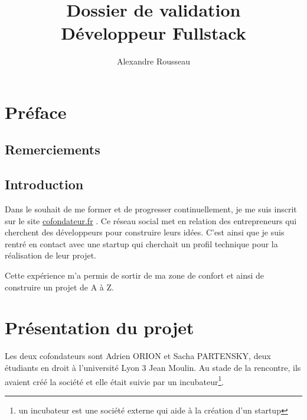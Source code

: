 \documentclass[]{report}
\title{\textbf{Dossier de validation}\\Développeur Fullstack}
\author{Alexandre Rousseau}
\begin{document}
\lstset{
  autogobble,%
  breaklines=true, %
  captionpos=b, %
  frame=single, %
  showtabs=false, %
  tabsize=2, %
}

\maketitle

\newpage

\tableofcontents
\newpage


\chapter{Préface}

  \section{Remerciements}


  \section{Introduction}

    Dans le souhait de me former et de progresser continuellement, je me suis inscrit sur le site  \href{https://cofondateur.fr}{cofondateur.fr} . Ce réseau social met en relation des entrepreneurs qui cherchent des développeurs pour construire leurs idées. C'est ainsi que je suis rentré en contact avec une startup qui cherchait un profil technique pour la réalisation de leur projet.

    Cette expérience  m'a permis de sortir de ma zone de confort et ainsi de construire un projet de A à Z.

\chapter{Présentation du projet}

  Les deux cofondateurs sont Adrien ORION et Sacha PARTENSKY, deux étudiants en droit à l’université Lyon 3 Jean Moulin. Au stade de la rencontre, ils avaient créé la société et elle était suivie par un incubateur\footnote{un incubateur est une société externe qui aide à la création d'un startup}.
\end{document}
